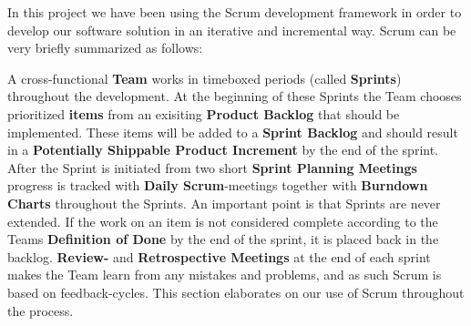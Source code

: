 In this project we have been using the Scrum development framework in order to develop our software solution in an iterative and incremental way. Scrum can be very briefly summarized as follows:

A cross-functional \textbf{Team} works in timeboxed periods (called \textbf{Sprints}) throughout the development. At the beginning of these Sprints the Team chooses prioritized \textbf{items} from an exisiting \textbf{Product Backlog} that should be implemented. These items will be added to a \textbf{Sprint Backlog} and should result in a \textbf{ Potentially Shippable Product Increment} by the end of the sprint.
After the Sprint is initiated from two short \textbf{Sprint Planning Meetings} progress is tracked with \textbf{Daily Scrum}-meetings together with \textbf{Burndown Charts} throughout the Sprints. An important point is that Sprints are never extended. If the work on an item is not considered complete according to the Teams \textbf{Definition of Done} by the end of the sprint, it is placed back in the backlog.
\textbf{Review-} and \textbf{Retrospective Meetings} at the end of each sprint makes the Team learn from any mistakes and problems, and as such Scrum is based on feedback-cycles.
This section elaborates on our use of Scrum throughout the process.